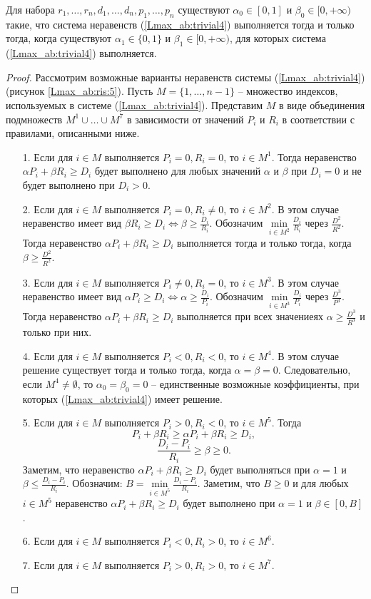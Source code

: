 \begin{theorem}\label{Lmax_ab:th:4}
Для набора $r_1, \dots, r_n, d_1, \dots, d_n, p_1, \dots, p_n$ существуют $\alpha_0 \in [0,1]$ и $\beta_0 \in [0, + \infty)$ такие, что система неравенств (\ref{Lmax_ab:trivial4}) выполняется тогда и только тогда, когда существуют $\alpha_1 \in \{0,1\}$ и $\beta_1 \in [0, +\infty)$, для которых система (\ref{Lmax_ab:trivial4}) выполняется.
\end{theorem}
\begin{proof}
Рассмотрим возможные варианты неравенств системы (\ref{Lmax_ab:trivial4}) (рисунок \ref{Lmax_ab:ris:5}). Пусть $M = \{1, \dots, n-1\}$ -- множество индексов, используемых в системе (\ref{Lmax_ab:trivial4}). Представим $M$ в виде объединения подмножеств $M^1 \cup \dots \cup M^7$ в зависимости от значений $P_i$ и $R_i$ в соответствии с правилами, описанными ниже.

\begin{enumerate}
\item[1.] Если для $i \in M$ выполняется $P_i =0, R_i =0$, то $i \in M^1$. Тогда неравенство $\alpha P_i + \beta R_i \geq D_i$ будет выполнено для любых значений $\alpha$ и $\beta$ при $D_i = 0$ и не будет выполнено при $D_i >0$.
\item[2.] Если для $i \in M$ выполняется $P_i =0, R_i \neq 0$, то $i \in M^2$. В этом случае неравенство имеет вид $\beta R_i \geq D_i \Leftrightarrow \beta \geq \frac{D_i}{R_i}$. Обозначим $\min\limits_{i \in M^2} \frac{D_i}{R_i}$ через $\frac{D^2}{R^2}$. Тогда неравенство $\alpha P_i + \beta R_i \geq D_i$ выполняется тогда и только тогда, когда $\beta \geq \frac{D^2}{R^2}$.
\item[3.] Если для $i \in M$ выполняется $P_i \neq 0, R_i = 0$, то $i \in M^3$. В этом случае неравенство имеет вид $\alpha P_i \geq D_i \Leftrightarrow \alpha \geq \frac{D_i}{P_i}$. Обозначим $\min\limits_{i \in M^3} \frac{D_i}{P_i}$ через $\frac{D^3}{P^3}$. Тогда неравенство $\alpha P_i + \beta R_i \geq D_i$ выполняется при всех значениеях $\alpha \geq \frac{D^3}{R^3}$ и только при них.
\item[4.] Если для $i \in M$ выполняется $P_i<0, R_i <0$, то $i \in M^4$. В этом случае решение существует тогда и только тогда, когда $\alpha = \beta = 0$. Следовательно, если $M^4 \neq \emptyset$, то $\alpha_0 = \beta_0 = 0$ -- единственные возможные коэффициенты, при которых (\ref{Lmax_ab:trivial4}) имеет решение.
\item[5.] Если для $i \in M$ выполняется $P_i>0, R_i < 0$, то $i \in M^5$. Тогда
$$P_i + \beta R_i \geq \alpha P_i + \beta R_i \geq D_i,$$
$$\frac{D_i - P_i}{R_i} \geq \beta \geq 0.$$
 Заметим, что неравенство $\alpha P_i + \beta R_i \geq D_i$ будет выполняться при $\alpha = 1$ и $\beta \leq \frac{D_i - P_i}{R_i}$. Обозначим: $B = \min\limits_{i \in M^5} \frac{D_i - P_i}{R_i}$. Заметим, что $B \geq 0$ и для любых $i \in M^5$ неравенство $\alpha P_i + \beta R_i \geq D_i$ будет выполнено при $\alpha = 1$ и $\beta \in [0,B]$.
\item[6.] Если для $i \in M$ выполняется $P_i<0, R_i > 0$, то $i \in M^6$.
\item[7.] Если для $i \in M$ выполняется $P_i > 0, R_i>0$, то $i \in M^7$.
\end{enumerate}


\end{proof}
